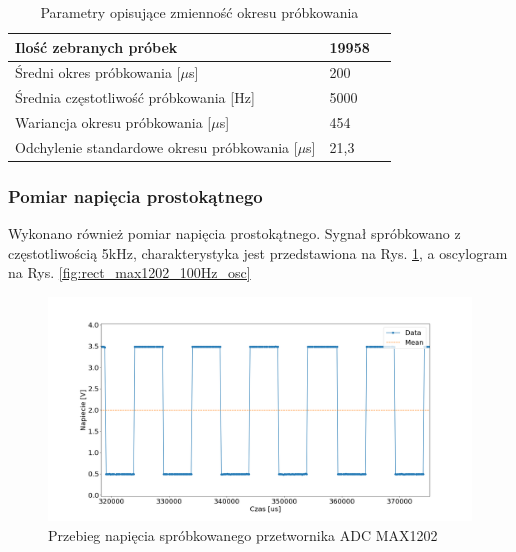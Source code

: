 \begin{table}[t]
\label{tab5.1}
\centering
\begin{tabular}{|l|l|l|}
  \hline 
  Ilość zebranych próbek & 19958 \\
  \hline
  Średni okres próbkowania [$\mu$s] & 200 \\
  \hline
  Średnia częstotliwość próbkowania [Hz]& 5000 \\
  \hline 
  Wariancja okresu próbkowania [$\mu$s]  & 454 \\
  \hline
  Odchylenie standardowe okresu próbkowania [$\mu$s] & 21,3 \\
  \hline

  
\end{tabular}
\caption{Parametry opisujące zmienność okresu próbkowania} 
\end{table}


\subsubsection{Pomiar napięcia prostokątnego}

Wykonano również pomiar napięcia prostokątnego. Sygnał spróbkowano z częstotliwością 5kHz, charakterystyka jest przedstawiona na Rys. \ref{fig:rect_max1202_100Hz_adc}, a oscylogram na Rys. \ref{fig:rect_max1202_100Hz_osc} 

\begin{figure}[h]
	\centering
		\includegraphics[width=15cm]{rect_max1202_100Hz_adc}
	\caption{Przebieg napięcia spróbkowanego przetwornika ADC MAX1202} 
	\label{fig:rect_max1202_100Hz_adc}
\end{figure}


